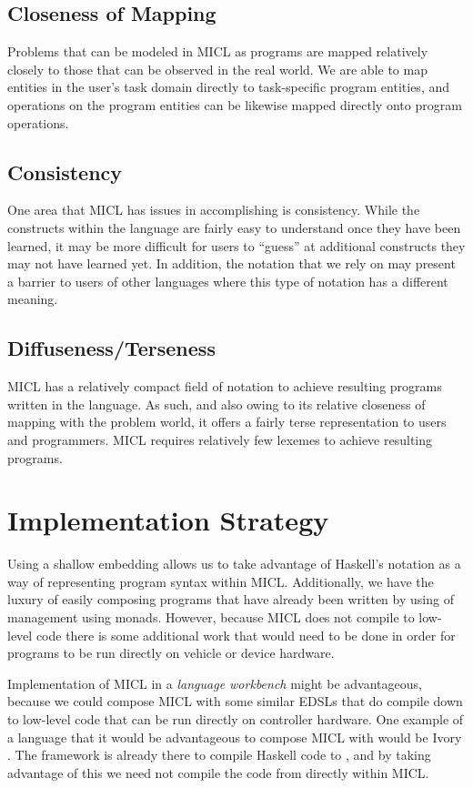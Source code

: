 \documentclass[11pt]{article}
\begin{document}
\subsection{Closeness of Mapping}
\label{sec:cogdim:map}
Problems that can be modeled in MICL as programs are mapped relatively closely
to those that can be observed in the real world. We are able to map entities
in the user's task domain directly to task-specific program entities, and
operations on the program entities can be likewise mapped directly onto
program operations.

\subsection{Consistency}
\label{sec:cogdim:cons}
One area that MICL has issues in accomplishing is consistency. While the
constructs within the language are fairly easy to understand once they have
been learned, it may be more difficult for users to ``guess'' at additional
constructs they may not have learned yet. In addition, the  notation
that we rely on may present a barrier to users of other languages where this
type of notation has a different meaning.

\subsection{Diffuseness/Terseness}
\label{sec:cogdim:diff}
MICL has a relatively compact field of notation to achieve resulting programs
written in the language. As such, and also owing to its relative closeness of
mapping with the problem world, it offers a fairly terse representation to
users and programmers. MICL requires relatively few lexemes to achieve
resulting programs.


\section{Implementation Strategy}
\label{sec:implementation}
Using a shallow embedding allows us to take advantage of Haskell's 
notation as a way of representing program syntax within MICL. Additionally, we
have the luxury of easily composing programs that have already been written
by using of  management using monads. However, because MICL does
not compile to low-level code there is some additional work that would need to
be done in order for programs to be run directly on vehicle or device
hardware.

Implementation of MICL in a \emph{language workbench} might be advantageous,
because we could compose MICL with some similar EDSLs that do compile down to
low-level code that can be run directly on controller hardware.  One example
of a language that it would be advantageous to compose MICL with would be
Ivory \cite{elliot2015ivory}. The framework is already there to compile
Haskell code to , and by taking advantage of this we need not
compile the code from directly within MICL.
\end{document}
